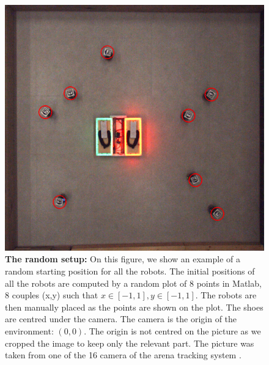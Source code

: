\documentclass[oneside, a4paper, 12pt]{memoir}
\let\oldCaption\caption
\renewcommand{\caption}[2]{
\oldCaption[#1]{{\small\sffamily\bfseries #1:} #2}
}
\begin{document}
				\begin{figure}[!htp]
					\includegraphics[width=\textwidth]{images/setup_random.png}
					\caption{The random setup}{On this figure, we show an example of a random starting position for all the robots. The initial positions of all the robots are computed by a random plot of 8 points in Matlab, 8 couples (x,y) such that $x \in [-1,1], y \in [-1,1]$. The robots are then manually placed as the points are shown on the plot. The shoes are centred under the camera. The camera is the origin of the environment: $(0,0)$. The origin is not centred on the picture as we cropped the image to keep only the relevant part. The picture was taken from one of the 16 camera of the arena tracking system \citep{stranieri2013iridia}.}
					\label{fig:random_setup}
				\end{figure}
			
\end{document}
